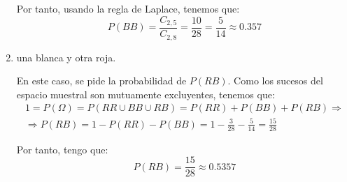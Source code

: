\begin{ejercicio}
\begin{enumerate}
        Por tanto, usando la regla de Laplace, tenemos que:
        \begin{equation*}
            P(BB)=\frac{C_{2,5}}{C_{2,8}} = \frac{10}{28} = \frac{5}{14} \approx 0.357
        \end{equation*}
        
        \item una blanca y otra roja.

        En este caso, se pide la probabilidad de $P(RB)$.  Como los sucesos del espacio muestral son mutuamente excluyentes, tenemos que:
        \begin{multline*}
            1=P(\Omega) = P(RR\cup BB \cup RB) =P(RR)+P(BB)+P(RB) \Longrightarrow \\ \Longrightarrow
            P(RB)=1-P(RR)-P(BB) = 1-\frac{3}{28}-\frac{5}{14}=\frac{15}{28}
        \end{multline*}

        Por tanto, tengo que:
        \begin{equation*}
            P(RB)=\frac{15}{28}\approx 0.5357
        \end{equation*}
    \end{enumerate}
\end{ejercicio}

